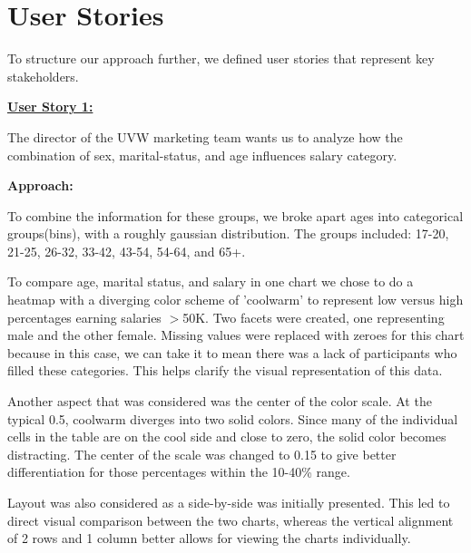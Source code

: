 \documentclass[journal,onecolumn]{IEEEtran}
\begin{document}
\section{User Stories}
To structure our approach further, we defined user stories that represent key stakeholders.

\underline{\textbf{User Story 1:}} 

The director of the UVW marketing team wants us to analyze how the
combination of sex, marital-status, and age influences salary category.

\textbf{Approach:} 

To combine the information for these groups, we broke apart ages into
categorical groups(bins), with a roughly gaussian distribution. The groups included:
17-20, 21-25, 26-32, 33-42, 43-54, 54-64, and 65+.

To compare age, marital status, and salary in one chart we chose to do a heatmap with a diverging color scheme of
'coolwarm' to represent low versus high percentages earning salaries $>$50K. Two facets were created, one representing male and the other female. 
Missing values were replaced with zeroes for this chart because in this case, we can take it to mean there was a lack
of participants who filled these categories. This helps clarify the visual representation of this data.

Another aspect that was considered was the center of the color scale. At the typical 0.5, coolwarm diverges into two solid colors.
Since many of the individual cells in the table are on the cool side and close to zero, the solid color becomes distracting.
The center of the scale was changed to 0.15 to give better differentiation for those percentages within the 10-40\% range.

Layout was also considered as a side-by-side was initially presented. This led to direct visual comparison between the two charts,
whereas the vertical alignment of 2 rows and 1 column better allows for viewing the charts individually.
\end{document}
